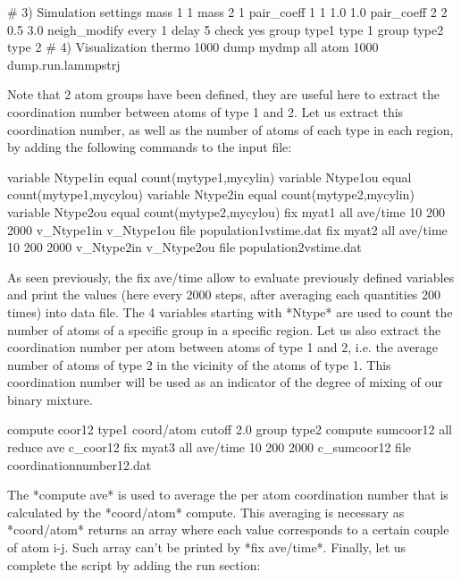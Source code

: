 \begin{lcverbatim}
# 3) Simulation settings
mass 1 1
mass 2 1
pair_coeff 1 1 1.0 1.0
pair_coeff 2 2 0.5 3.0
neigh_modify every 1 delay 5 check yes
group type1 type 1
group type2 type 2
# 4) Visualization
thermo 1000
dump mydmp all atom 1000 dump.run.lammpstrj
\end{lcverbatim}

Note that 2 atom groups have been defined, they are useful
here to extract the coordination number between atoms of
type 1 and 2. Let us extract this coordination number, as
well as the number of atoms of each type in each region, by
adding the following commands to the input file:



\begin{lcverbatim}
variable Ntype1in equal count(mytype1,mycylin)
variable Ntype1ou equal count(mytype1,mycylou)
variable Ntype2in equal count(mytype2,mycylin)
variable Ntype2ou equal count(mytype2,mycylou)
fix myat1 all ave/time 10 200 2000 v_Ntype1in v_Ntype1ou file population1vstime.dat
fix myat2 all ave/time 10 200 2000 v_Ntype2in v_Ntype2ou file population2vstime.dat
\end{lcverbatim}

As seen previously, the fix ave/time
allow to evaluate previously defined variables and print
the values (here every 2000 steps, after averaging each quantities 200 times)
into data file. The 4 variables starting with *Ntype* are used to count
the number of atoms of a specific group in a specific
region. 
Let us also extract the coordination number per atom between atoms 
of type 1 and 2, i.e. the average number of atoms of type 2 in the vicinity 
of the atoms of type 1. This coordination number will be used as an indicator of the 
degree of mixing of our binary mixture. 




\begin{lcverbatim}
compute coor12 type1 coord/atom cutoff 2.0 group type2
compute sumcoor12 all reduce ave c_coor12
fix myat3 all ave/time 10 200 2000 c_sumcoor12 file coordinationnumber12.dat

\end{lcverbatim}

The *compute ave* is used to average the per atom
coordination number that is calculated by the *coord/atom* compute.
This averaging is necessary as *coord/atom* returns an array where each value corresponds 
to a certain couple of atom i-j. Such array can't be printed by *fix ave/time*. 
Finally, let us complete the script by adding the run section:



